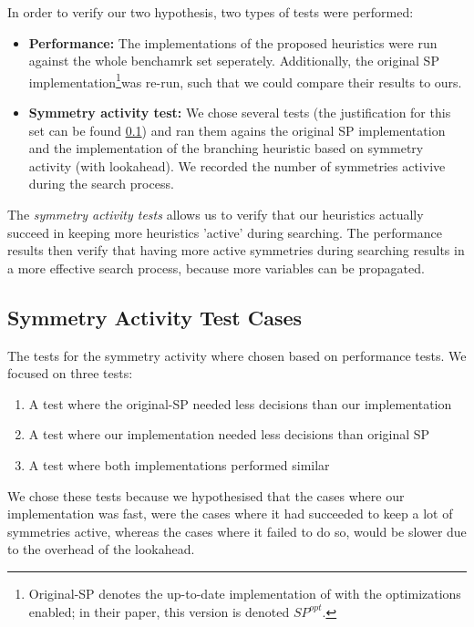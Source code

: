 
In order to verify our two hypothesis, two types of tests were performed:

\begin{itemize}
	\item {\bf Performance:}
		The implementations of the proposed heuristics were run against the whole
		benchamrk set seperately.
		Additionally, the original SP implementation\footnote{
			Original-SP denotes the up-to-date implementation of \cite{devriendt2012symmetry} with
			the optimizations enabled; in their paper, this version is denoted $SP^{opt}$.
		}was re-run, such that we could compare their
		results to ours.

	\item {\bf Symmetry activity test:}
		We chose several tests (the justification for this set can be found
		\ref{ssec:sym_act_test_cases}) and ran them agains the original SP implementation and the
		implementation of the branching heuristic based on symmetry activity (with lookahead).
		We recorded the number of symmetries activive during the search process.

\end{itemize}

The \emph{symmetry activity tests} allows us to verify that our heuristics actually succeed in
keeping more heuristics 'active' during searching.
The performance results then verify that having more active symmetries during searching results in a
more effective search process, because more variables can be propagated.

\subsection{Symmetry Activity Test Cases}
\label{ssec:sym_act_test_cases}
	The tests for the symmetry activity where chosen based on performance tests.
	We focused on three tests:

	\begin{enumerate}
		\item A test where the original-SP needed less decisions than our implementation
		\item A test where our implementation needed less decisions than original SP
		\item A test where both implementations performed similar
	\end{enumerate}

	We chose these tests because we hypothesised that the cases where our implementation was fast,
	were the cases where it had succeeded to keep a lot of symmetries active, whereas the cases
	where it failed to do so, would be slower due to the overhead of the lookahead.

